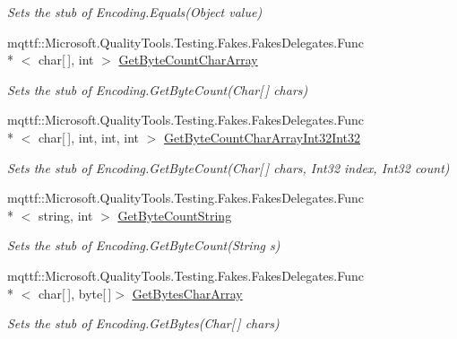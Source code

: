 \begin{DoxyCompactItemize}
\begin{DoxyCompactList}\small\item\em Sets the stub of Encoding.\-Equals(\-Object value)\end{DoxyCompactList}\item 
mqttf\-::\-Microsoft.\-Quality\-Tools.\-Testing.\-Fakes.\-Fakes\-Delegates.\-Func\\*
$<$ char\mbox{[}$\,$\mbox{]}, int $>$ \hyperlink{class_system_1_1_text_1_1_fakes_1_1_stub_encoding_abc929e5ecebd13cb5a246395b79ae770}{Get\-Byte\-Count\-Char\-Array}
\begin{DoxyCompactList}\small\item\em Sets the stub of Encoding.\-Get\-Byte\-Count(\-Char\mbox{[}$\,$\mbox{]} chars)\end{DoxyCompactList}\item 
mqttf\-::\-Microsoft.\-Quality\-Tools.\-Testing.\-Fakes.\-Fakes\-Delegates.\-Func\\*
$<$ char\mbox{[}$\,$\mbox{]}, int, int, int $>$ \hyperlink{class_system_1_1_text_1_1_fakes_1_1_stub_encoding_aa36720c5f4e417c16c9e1ff53df1a77b}{Get\-Byte\-Count\-Char\-Array\-Int32\-Int32}
\begin{DoxyCompactList}\small\item\em Sets the stub of Encoding.\-Get\-Byte\-Count(\-Char\mbox{[}$\,$\mbox{]} chars, Int32 index, Int32 count)\end{DoxyCompactList}\item 
mqttf\-::\-Microsoft.\-Quality\-Tools.\-Testing.\-Fakes.\-Fakes\-Delegates.\-Func\\*
$<$ string, int $>$ \hyperlink{class_system_1_1_text_1_1_fakes_1_1_stub_encoding_a55dd93a2401047a5d1d2ffcf203491e9}{Get\-Byte\-Count\-String}
\begin{DoxyCompactList}\small\item\em Sets the stub of Encoding.\-Get\-Byte\-Count(\-String s)\end{DoxyCompactList}\item 
mqttf\-::\-Microsoft.\-Quality\-Tools.\-Testing.\-Fakes.\-Fakes\-Delegates.\-Func\\*
$<$ char\mbox{[}$\,$\mbox{]}, byte\mbox{[}$\,$\mbox{]}$>$ \hyperlink{class_system_1_1_text_1_1_fakes_1_1_stub_encoding_af0328e3bd2119d208de18c27bb2cdcaa}{Get\-Bytes\-Char\-Array}
\begin{DoxyCompactList}\small\item\em Sets the stub of Encoding.\-Get\-Bytes(\-Char\mbox{[}$\,$\mbox{]} chars)\end{DoxyCompactList}\item 

\end{DoxyCompactItemize}

